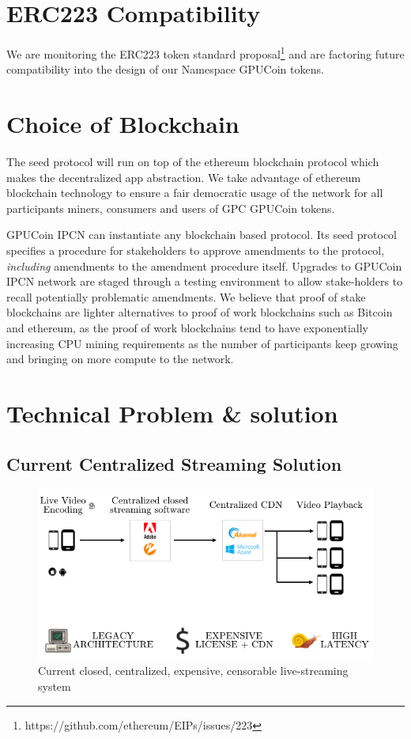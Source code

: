 \documentclass{article}
\begin{document}
\section{ERC223 Compatibility}
We are monitoring the ERC223 token standard proposal\footnote{https://github.com/ethereum/EIPs/issues/223} and are factoring future compatibility into the design of our Namespace GPUCoin tokens.

\section{Choice of Blockchain}
The seed protocol will run on top of the ethereum blockchain protocol which makes the decentralized app abstraction. We take advantage of ethereum blockchain technology to ensure a fair democratic usage of the network for all participants miners, consumers and users of GPC GPUCoin tokens.



GPUCoin IPCN can instantiate any blockchain based protocol. Its seed protocol specifies a procedure for stakeholders to approve amendments to the protocol, \emph{including} amendments to the amendment procedure itself. Upgrades to GPUCoin IPCN network are staged through a testing environment to allow stake-holders to recall potentially problematic amendments. We believe that proof of stake blockchains are lighter alternatives to proof of work blockchains such as Bitcoin and ethereum, as the proof of work blockchains tend to have exponentially increasing CPU mining requirements as the number of participants keep growing and bringing on more compute to the network.

\section{Technical Problem \& solution}

\subsection{Current Centralized Streaming Solution}

\begin{figure}[h!]
 \centering
 \includegraphics[width=1.0\textwidth]{static/problem-architecture-trans-cmrfont}
 \caption{Current closed, centralized, expensive, censorable live-streaming system}
 \label{image:problem-architecture-trans-cmrfont}
\end{figure}
\end{document}
